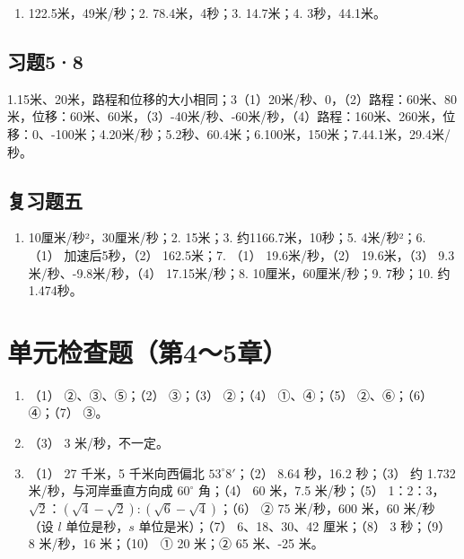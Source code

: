 \begin{enumerate}
\def\labelenumi{\arabic{enumi}.}
\tightlist
\item
  122.5米，49米/秒；2. 78.4米，4秒；3. 14.7米；4. 3秒，44.1米。
\end{enumerate}

\subsection{习题5·8}\label{ux4e60ux989858-1}

1.15米、20米，路程和位移的大小相同；3（1）20米/秒、0，（2）路程：60米、80米，位移：60米、60米，（3）-40米/秒、-60米/秒，（4）路程：160米、260米，位移：0、-100米；4.20米/秒；5.2秒、60.4米；6.100米，150米；7.44.1米，29.4米/秒。

\subsection{复习题五}\label{ux590dux4e60ux9898ux4e94-1}

\begin{enumerate}
\def\labelenumi{\arabic{enumi}.}
\tightlist
\item
  10厘米/秒²，30厘米/秒；2. 15米；3. 约1166.7米，10秒；5. 4米/秒²；6.
  （1） 加速后5秒，（2） 162.5米；7. （1） 19.6米/秒，（2）
  19.6米，（3） 9.3米/秒、-9.8米/秒，（4） 17.15米/秒；8.
  10厘米，60厘米/秒；9. 7秒；10. 约1.474秒。
\end{enumerate}

\section{单元检查题（第4～5章）}\label{ux5355ux5143ux68c0ux67e5ux9898ux7b2c45ux7ae0-1}

\begin{enumerate}
\def\labelenumi{\arabic{enumi}.}
\item
  （1） ②、③、⑤；（2） ③；（3） ②；（4） ①、④；（5） ②、⑥；（6）
  ④；（7） ③。
\item
  （3） 3 米/秒，不一定。
\item
  （1） 27 千米，5 千米向西偏北 \(53^{\circ}8'\)；（2） 8.64 秒，16.2
  秒；（3） 约 1.732 米/秒，与河岸垂直方向成 \(60^{\circ}\) 角；（4） 60
  米，7.5 米/秒；（5）
  1：2：3，\(\sqrt{2}\)：\((\sqrt{4} - \sqrt{2}): (\sqrt{6} - \sqrt{4})\)；（6）
  ② 75 米/秒，600 米，60 米/秒 （设 \(l\) 单位是秒，\(s\)
  单位是米）；（7） 6、18、30、42 厘米；（8） 3 秒；（9） 8 米/秒，16
  米；（10） ① 20 米；② 65 米、-25 米。
\end{enumerate}

